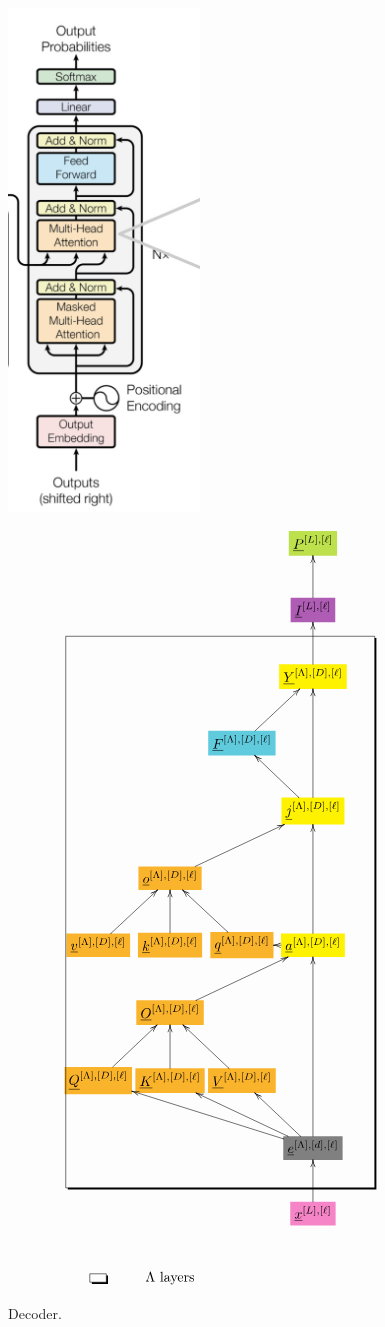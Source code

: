 \documentclass[12pt]{article}
\begin{document}
\begin{figure}[h!]\centering
\begin{minipage}{.4\linewidth}
\includegraphics[width=2in]{decoder.jpg}
\end{minipage}%
\begin{minipage}{.6\linewidth}
$$\xymatrix@R=2.5pc@C=0.2pc{
&&&*+[F*:SpringGreen]{\underline{P}^{[L],[\ell]}}
\\
&&&*+[F*:Orchid]{\underline{I}^{[L],[\ell]}}\ar[u]
\\
&&&*+[F*:yellow]{\underline{Y}^{[\Lambda],[D], [\ell]}}\ar[u]
\\
&&*+[F*:SkyBlue]{\underline{F}^{[\Lambda],[D], [\ell]}}\ar[ur]&
\\
&&&*+[F*:yellow]{\underline{j}^{[\Lambda],[D], [\ell]}}\ar[ul]\ar[uu]
\\
&*+[F*:Dandelion]{\underline{o}^{[\Lambda],[D],[\ell]}}\ar[urr]&&
\\
*+[F*:Dandelion]{\underline{v}^{[\Lambda],[D], [\ell]}}\ar[ur]&*+[F*:Dandelion]{\underline{k}^{[\Lambda],[D], [\ell]}}\ar[u]&*+[F*:Dandelion]{\underline{q}^{[\Lambda],[D], [\ell]}}\ar[ul]&*+[F*:yellow]{\underline{a}^{[\Lambda],[D], [\ell]}}\ar[uu]\ar[l]
\\
&*+[F*:Dandelion]{\underline{O}^{[\Lambda],[D],[\ell]}}\ar[urr]&&
\\
*+[F*:Dandelion]{\underline{Q}^{[\Lambda],[D], [\ell]}}\ar[ur]&*+[F*:Dandelion]{\underline{K}^{[\Lambda],[D], [\ell]}}\ar[u]&*+[F*:Dandelion]{\underline{V}^{[\Lambda],[D], [\ell]}}\ar[ul]&
\\
&&&*+[F*:gray]{\underline{e}^{[\Lambda],[d],[\ell]}}\ar[ull]\ar[ulll]\ar[ul]\ar[uuu]
\\
&&&*+[F*:Lavender]{\underline{x}^{[L],[\ell]}}\ar[u]
\save
\POS"3,1"."10,1"."3,4"."10,4"!C*+<4.0em>\frm{-,}
\restore
\\
*+[F-,]{\;\;}&\text{$\Lambda$ layers}
}$$
\end{minipage}
\caption{Decoder.}
\label{fig-texnn-for-decoder}
\end{figure}
\end{document}
